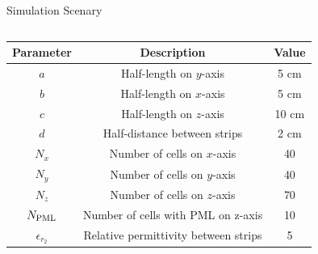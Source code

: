 \documentclass[aspectratio=169]{beamer}
\begin{document}
\begin{frame}{Simulation Scenary}
    \begin{center}
      \resizebox{0.65\textwidth}{!}
      { 
        
        
      }
    \end{center}
    \vspace{-1cm}
      \begin{columns}
        
        \begin{column}{0.4\textwidth}
          \begin{table}[H]
          \resizebox{\textwidth}{!}
          {
            \begin{tabular}{|c|c|c|}
            \hline
            \textbf{Parameter} & \textbf{Description}               & \textbf{Value} \\ \hline
            $a$                & Half-length on $y$-axis              & 5 cm           \\ \hline
            $b$                & Half-length on $x$-axis              & 5 cm           \\ \hline
            $c$                & Half-length on $z$-axis              & 10 cm          \\ \hline
            $d$                & Half-distance between strips       & 2 cm           \\ \hline
            $N_x$              & Number of cells on $x$-axis          & 40             \\ \hline
            $N_y$              & Number of cells on $y$-axis          & 40             \\ \hline
            $N_z$              & Number of cells on $z$-axis          & 70             \\ \hline
            $N_{\textnormal{PML}}$          & Number of cells with PML on z-axis & 10             \\ \hline
            $\epsilon_{r_2}$          & Relative permittivity between strips & 5             \\ \hline
            \end{tabular}
          }
          \end{table}
          
        \end{column}


\end{columns}
\end{frame}
\end{document}
